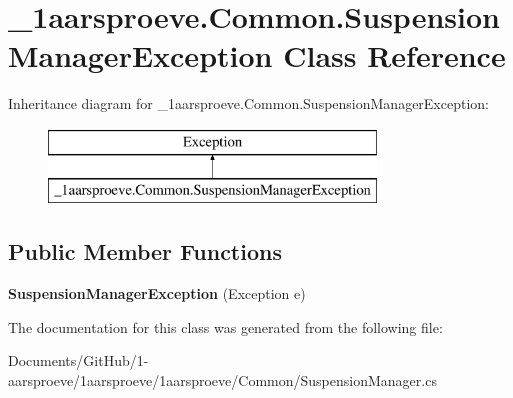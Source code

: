 \hypertarget{class__1aarsproeve_1_1_common_1_1_suspension_manager_exception}{}\section{\+\_\+1aarsproeve.\+Common.\+Suspension\+Manager\+Exception Class Reference}
\label{class__1aarsproeve_1_1_common_1_1_suspension_manager_exception}
Inheritance diagram for \+\_\+1aarsproeve.\+Common.\+Suspension\+Manager\+Exception\+:\begin{figure}[H]
\begin{center}
\leavevmode
\includegraphics[height=2.000000cm]{class__1aarsproeve_1_1_common_1_1_suspension_manager_exception}
\end{center}
\end{figure}
\subsection*{Public Member Functions}
\begin{DoxyCompactItemize}
\item 
\hypertarget{class__1aarsproeve_1_1_common_1_1_suspension_manager_exception_a7beaead1dc1988f760ae8913a5b2b4c8}{}{\bfseries Suspension\+Manager\+Exception} (Exception e)\label{class__1aarsproeve_1_1_common_1_1_suspension_manager_exception_a7beaead1dc1988f760ae8913a5b2b4c8}

\end{DoxyCompactItemize}


The documentation for this class was generated from the following file\+:\begin{DoxyCompactItemize}
\item 
Documents/\+Git\+Hub/1-\/aarsproeve/1aarsproeve/1aarsproeve/\+Common/Suspension\+Manager.\+cs\end{DoxyCompactItemize}
